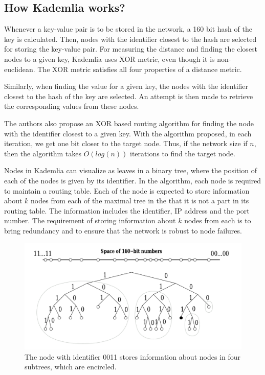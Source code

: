 \subsection{How Kademlia works?}

Whenever a key-value pair is to be stored in the network, a 160 bit hash of the
key is calculated. Then, nodes with the identifier closest to the hash are
selected for storing the key-value pair. For measuring the distance and finding
the closest nodes to a given key, Kademlia uses XOR metric, even though it is
non-euclidean. The XOR metric satisfies all four properties of a distance
metric.
\cite{MetricSpace2022}

Similarly, when finding the value for a given key, the nodes with the identifier
closest to the hash of the key are selected. An attempt is then made to retrieve
the corresponding values from these nodes.

The authors also propose an XOR based routing algorithm for finding the node
with the identifier closest to a given key. With the algorithm proposed, in each
iteration, we get one bit closer to the target node. Thus, if the network size
if $n$, then the algorithm takes $O(log(n))$ iterations to find the target node.

Nodes in Kademlia can visualize as leaves in a binary tree, where the position of
each of the nodes is given by its identifier. In the algorithm, each node is
required to maintain a routing table. Each of the node is expected to store
information about $k$ nodes from each of the maximal tree in the that it is not
a part in its routing table. The information includes the identifier, IP address
and the port number. The requirement of storing information about $k$ nodes from
each is to bring redundancy and to ensure that the network is robust to node
failures.

\begin{figure}[h]
      \centering
      \includegraphics[width=1.0\textwidth]{kademlia.png}
      \caption[Kademlia]{The node with identifier 0011 stores information about
            nodes in four subtrees, which are encircled.
            \cite{petarmaymounkovKademliaPeertoPeerInformation2002}}
\end{figure}

